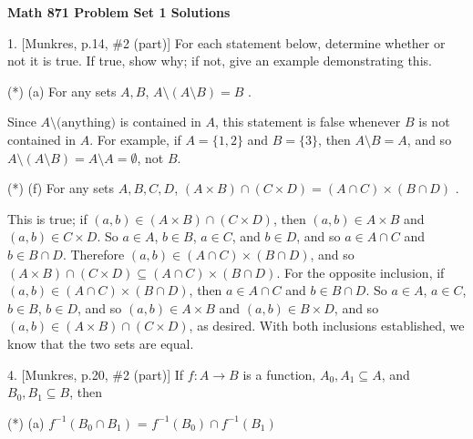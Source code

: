 


\def\ctln{\centerline}
\def\msk{\medskip}
\def\bsk{\bigskip}
\def\ssk{\smallskip}
\def\ra{\rightarrow}
\def\ubr{\underbar}
\def\nidt{\noindent}

\UseAMSsymbols

\ctln{\bf Math 871 Problem Set 1 Solutions}

\msk

\item{1.} [Munkres, p.14, \#2 (part)] For each statement below,
determine whether or not it is true. If true, show why; if 
not, give an example demonstrating this.

\ssk

\item{(*)} (a) For any sets $A,B$, $A \setminus (A\setminus B) = B$ .

\ssk

Since $A\setminus\text{(anything)}$ is contained in $A$, this statement is false
whenever $B$ is not contained in $A$. For example, if $A=\{1,2\}$ and $B=\{3\}$, then 
$A\setminus B = A$, and so $A\setminus(A\setminus B)=A\setminus A = \emptyset$, 
not $B$.

\ssk

\item{(*)} (f) For any sets $A,B,C,D$, $(A\times B)\cap(C\times D) = (A\cap C)\times (B\cap D)$ .

\ssk

This is true; if $(a,b)\in (A\times B)\cap(C\times D)$, then $(a,b)\in A\times B$ and $(a,b)\in C\times D$.
So $a\in A$, $b\in B$, $a\in C$, and $b\in D$, and so $a\in A\cap C$ and $b\in B\cap D$.
Therefore $(a,b)\in (A\cap C)\times (B\cap D)$, and so $(A\times B)\cap(C\times D) \subseteq (A\cap C)\times (B\cap D)$.
For the opposite inclusion, if 
$(a,b)\in (A\cap C)\times (B\cap D)$, then $a\in A\cap C$ and $b\in B\cap D$. So
$a\in A$, $a\in C$, $b\in B$, $b\in D$, and so $(a,b)\in A\times B$ and $(a,b)\in B\times D$,
and so $(a,b)\in (A\times B)\cap(C\times D)$, as desired. With both inclusions established, we
know that the two sets are equal.

\msk

\item{4.} [Munkres, p.20, \#2 (part)] If $f:A\ra B$ is a function, $A_0,A_1\subseteq A$,
and $B_0,B_1\subseteq B$, then

\ssk

\item{(*)} (a) $f^{-1}(B_0\cap B_1)$ = $f^{-1}(B_0) \cap f^{-1}(B_1)$

